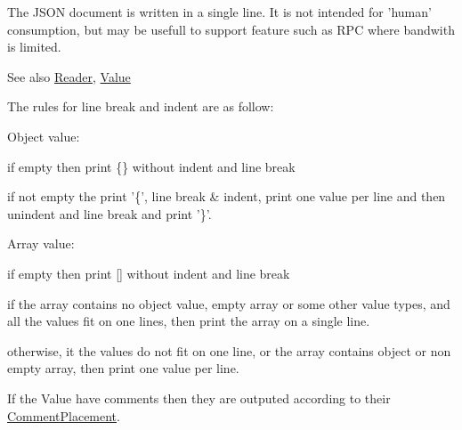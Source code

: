 The J\-S\-O\-N document is written in a single line. It is not intended for 'human' consumption, but may be usefull to support feature such as R\-P\-C where bandwith is limited. \begin{DoxySeeAlso}{See also}
\hyperlink{protocol_json_1_1_j_s_o_n___a_p_i_a8d5594b46204fb65661a8c96c015ea54}{Reader}, \hyperlink{protocol_json_1_1_j_s_o_n___a_p_i_a3a85c4423131080eb9300546d6130dfd}{Value}
\end{DoxySeeAlso}
The rules for line break and indent are as follow\-:
\begin{DoxyItemize}
\item Object value\-:
\begin{DoxyItemize}
\item if empty then print \{\} without indent and line break
\item if not empty the print '\{', line break \& indent, print one value per line and then unindent and line break and print '\}'.
\end{DoxyItemize}
\item Array value\-:
\begin{DoxyItemize}
\item if empty then print \mbox{[}\mbox{]} without indent and line break
\item if the array contains no object value, empty array or some other value types, and all the values fit on one lines, then print the array on a single line.
\item otherwise, it the values do not fit on one line, or the array contains object or non empty array, then print one value per line.
\end{DoxyItemize}
\end{DoxyItemize}

If the Value have comments then they are outputed according to their \hyperlink{namespace_json_a4fc417c23905b2ae9e2c47d197a45351}{Comment\-Placement}.

